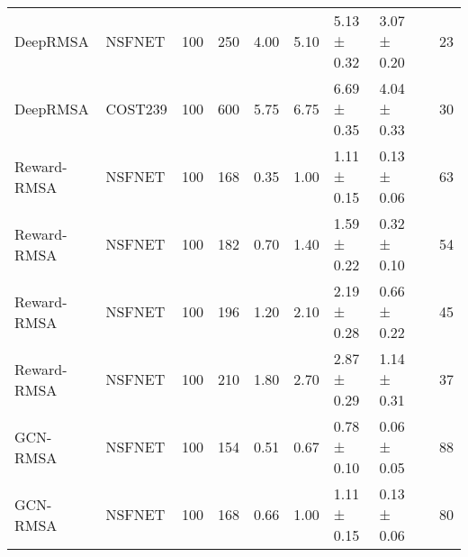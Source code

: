 \begin{longtable}[!htbp]{llll|lllll|l}
DeepRMSA             & NSFNET            & 100                  & 250                                                               & 4.00    & \multicolumn{1}{l|}{5.10}     & 5.13 ± 0.32 & 3.07 ± 0.20      &                   & 23                                                                                    \\
DeepRMSA             & COST239           & 100                  & 600                                                               & 5.75 & \multicolumn{1}{l|}{6.75}    & 6.69 ± 0.35  & 4.04 ± 0.33      &                   & 30                                                                                    \\
Reward-RMSA          & NSFNET            & 100                  & 168                                                               & 0.35  & \multicolumn{1}{l|}{1.00}       & 1.11 ± 0.15  & 0.13 ± 0.06       &                   & 63                                                                                    \\
Reward-RMSA          & NSFNET            & 100                  & 182                                                               & 0.70  & \multicolumn{1}{l|}{1.40}       & 1.59 ± 0.22  & 0.32 ± 0.10       &                   & 54                                                                                    \\
Reward-RMSA          & NSFNET            & 100                  & 196                                                               & 1.20  & \multicolumn{1}{l|}{2.10}       & 2.19 ± 0.28  & 0.66 ± 0.22       &                   & 45                                                                                    \\
Reward-RMSA          & NSFNET            & 100                  & 210                                                               & 1.80  & \multicolumn{1}{l|}{2.70}       & 2.87 ± 0.29  & 1.14 ± 0.31       &                   & 37                                                                                    \\                                                      
GCN-RMSA             & NSFNET            & 100                  & 154                                                               & 0.51 & \multicolumn{1}{l|}{0.67}    & 0.78 ± 0.10 & 0.06 ± 0.05      &                   & 88                                                                                    \\
GCN-RMSA             & NSFNET            & 100                  & 168                                                               & 0.66 & \multicolumn{1}{l|}{1.00}       & 1.11 ± 0.15 & 0.13 ± 0.06      &                   & 80                                                                                    \\

\end{longtable}

